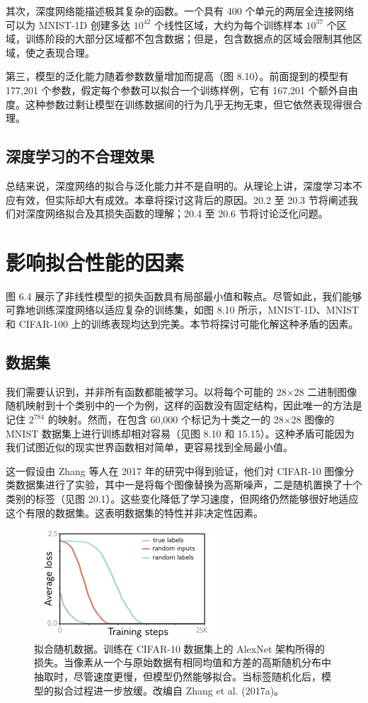 其次，深度网络能描述极其复杂的函数。一个具有 400 个单元的两层全连接网络可以为 MNIST-1D 创建多达 \(10^42\) 个线性区域，大约为每个训练样本 \(10^37\) 个区域，训练阶段的大部分区域都不包含数据；但是，包含数据点的区域会限制其他区域，使之表现合理。

第三，模型的泛化能力随着参数数量增加而提高（图 8.10）。前面提到的模型有 177,201 个参数，假定每个参数可以拟合一个训练样例，它有 167,201 个额外自由度。这种参数过剩让模型在训练数据间的行为几乎无拘无束，但它依然表现得很合理。

\subsection{深度学习的不合理效果}
总结来说，深度网络的拟合与泛化能力并不是自明的。从理论上讲，深度学习本不应有效，但实际却大有成效。本章将探讨这背后的原因。20.2 至 20.3 节将阐述我们对深度网络拟合及其损失函数的理解；20.4 至 20.6 节将讨论泛化问题。

\section{影响拟合性能的因素}
图 6.4 展示了非线性模型的损失函数具有局部最小值和鞍点。尽管如此，我们能够可靠地训练深度网络以适应复杂的训练集，如图 8.10 所示，MNIST-1D、MNIST 和 CIFAR-100 上的训练表现均达到完美。本节将探讨可能化解这种矛盾的因素。

\subsection{数据集}
我们需要认识到，并非所有函数都能被学习。以将每个可能的 28×28 二进制图像随机映射到十个类别中的一个为例，这样的函数没有固定结构，因此唯一的方法是记住 \(2^784\) 的映射。然而，在包含 60,000 个标记为十类之一的 28×28 图像的 MNIST 数据集上进行训练却相对容易（见图 8.10 和 15.15）。这种矛盾可能因为我们试图近似的现实世界函数相对简单，更容易找到全局最小值。

这一假设由 Zhang 等人在 2017 年的研究中得到验证，他们对 CIFAR-10 图像分类数据集进行了实验，其中一是将每个图像替换为高斯噪声，二是随机置换了十个类别的标签（见图 20.1）。这些变化降低了学习速度，但网络仍然能够很好地适应这个有限的数据集。这表明数据集的特性并非决定性因素。

\begin{figure}[ht!]
\centering
\includegraphics[width=0.7\linewidth]{png/chapter20/WhyZhangResults.png}
\caption{拟合随机数据。训练在 CIFAR-10 数据集上的 AlexNet 架构所得的损失。当像素从一个与原始数据有相同均值和方差的高斯随机分布中抽取时，尽管速度更慢，但模型仍然能够拟合。当标签随机化后，模型的拟合过程进一步放缓。改编自 Zhang et al. (2017a)。}
\end{figure}

